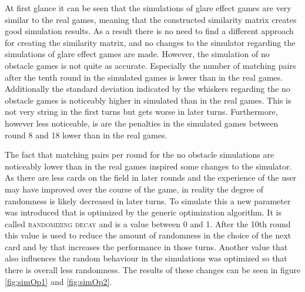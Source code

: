 At first glance it can be seen that the simulations of glare effect games are very similar to the real games, meaning that the constructed similarity matrix creates good simulation results. As a result there is no need to find a different approach for creating the similarity matrix, and no changes to the simulator regarding the simulations of glare effect games are made. However, the simulation of no obstacle games is not quite as accurate. Especially the number of matching pairs after the tenth round in the simulated games is lower than in the real games. Additionally the standard deviation indicated by the whiskers regarding the no obstacle games is noticeably higher in simulated than in the real games. This is not very string in the first turns but gets worse in later turns. Furthermore, however less noticeable, is are the penalties in the simulated games between round 8 and 18 lower than in the real games.

\newpage

The fact that matching pairs per round for the no obstacle simulations are noticeably lower than in the real games inspired some changes to the simulator. As there are less cards on the field in later rounds and the experience of the user may have improved over the course of the game, in reality the degree of randomness is likely decreased in later turns. To simulate this a new parameter was introduced that is optimized by the generic optimization algorithm. It is called \textsc{randomizing decay} and is a value between 0 and 1. After the 10th round this value is used to reduce the amount of randomness in the choice of the next card and by that increases the performance in those turns. Another value that also influences the random behaviour in the simulations was optimized so that there is overall less randomness. The results of these changes can be seen in figure \ref{fig:simOp1} and \ref{fig:simOp2}. 


